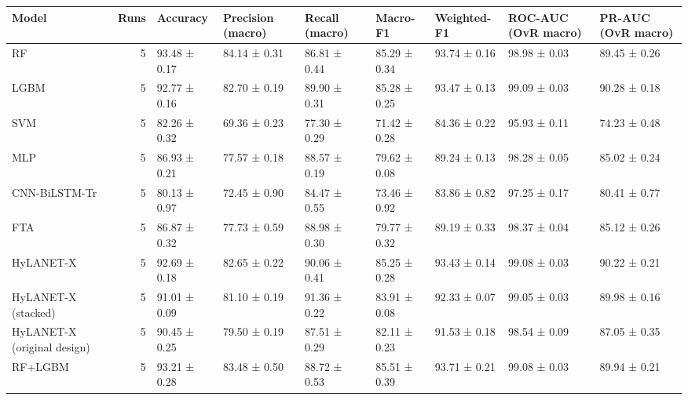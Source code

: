 \begin{tabular}{lrlllllll}
\toprule
Model & Runs & Accuracy & Precision (macro) & Recall (macro) & Macro-F1 & Weighted-F1 & ROC-AUC (OvR macro) & PR-AUC (OvR macro) \\
\midrule
RF & 5 & 93.48 ± 0.17 & 84.14 ± 0.31 & 86.81 ± 0.44 & 85.29 ± 0.34 & 93.74 ± 0.16 & 98.98 ± 0.03 & 89.45 ± 0.26 \\
LGBM & 5 & 92.77 ± 0.16 & 82.70 ± 0.19 & 89.90 ± 0.31 & 85.28 ± 0.25 & 93.47 ± 0.13 & 99.09 ± 0.03 & 90.28 ± 0.18 \\
SVM & 5 & 82.26 ± 0.32 & 69.36 ± 0.23 & 77.30 ± 0.29 & 71.42 ± 0.28 & 84.36 ± 0.22 & 95.93 ± 0.11 & 74.23 ± 0.48 \\
MLP & 5 & 86.93 ± 0.21 & 77.57 ± 0.18 & 88.57 ± 0.19 & 79.62 ± 0.08 & 89.24 ± 0.13 & 98.28 ± 0.05 & 85.02 ± 0.24 \\
CNN-BiLSTM-Tr & 5 & 80.13 ± 0.97 & 72.45 ± 0.90 & 84.47 ± 0.55 & 73.46 ± 0.92 & 83.86 ± 0.82 & 97.25 ± 0.17 & 80.41 ± 0.77 \\
FTA & 5 & 86.87 ± 0.32 & 77.73 ± 0.59 & 88.98 ± 0.30 & 79.77 ± 0.32 & 89.19 ± 0.33 & 98.37 ± 0.04 & 85.12 ± 0.26 \\
HyLANET-X & 5 & 92.69 ± 0.18 & 82.65 ± 0.22 & 90.06 ± 0.41 & 85.25 ± 0.28 & 93.43 ± 0.14 & 99.08 ± 0.03 & 90.22 ± 0.21 \\
HyLANET-X (stacked) & 5 & 91.01 ± 0.09 & 81.10 ± 0.19 & 91.36 ± 0.22 & 83.91 ± 0.08 & 92.33 ± 0.07 & 99.05 ± 0.03 & 89.98 ± 0.16 \\
HyLANET-X (original design) & 5 & 90.45 ± 0.25 & 79.50 ± 0.19 & 87.51 ± 0.29 & 82.11 ± 0.23 & 91.53 ± 0.18 & 98.54 ± 0.09 & 87.05 ± 0.35 \\
RF+LGBM & 5 & 93.21 ± 0.28 & 83.48 ± 0.50 & 88.72 ± 0.53 & 85.51 ± 0.39 & 93.71 ± 0.21 & 99.08 ± 0.03 & 89.94 ± 0.21 \\
\bottomrule
\end{tabular}
